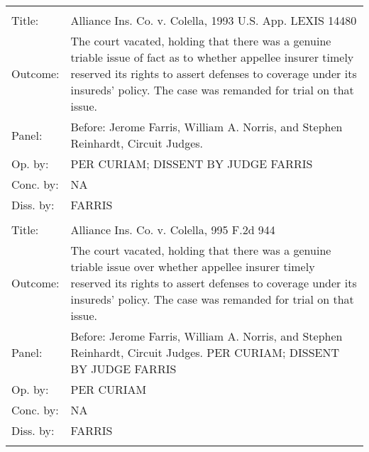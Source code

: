 \documentclass[10pt, letterpaper]{article}
\begin{document}
\begin{spacing}{1.0}
\begin{footnotesize}
\begin{longtable}[H]{lp{6in}}
        \arrayrulecolor{black}\hline\\[-4pt]
        Title: & Alliance Ins. Co. v. Colella, 1993 U.S. App. LEXIS 14480\\[2pt]
        Outcome: & The court vacated, holding that there was a genuine triable issue of fact as to whether appellee insurer timely reserved its rights to assert defenses to coverage under its insureds' policy. The case was remanded for trial on that issue.\\[2pt]
        Panel: & Before: Jerome Farris, William A. Norris, and Stephen Reinhardt, Circuit Judges.  \\[2pt]
        Op. by: & PER CURIAM; DISSENT BY JUDGE FARRIS \\[2pt]
        Conc. by: & NA\\[2pt]
        Diss. by: &  FARRIS \\[2pt]
        \arrayrulecolor{gray}\hline\\[-4pt]
        Title: & Alliance Ins. Co. v. Colella, 995 F.2d 944\\[2pt]
        Outcome: & The court vacated, holding that there was a genuine triable issue over whether appellee insurer timely reserved its rights to assert defenses to coverage under its insureds' policy. The case was remanded for trial on that issue.\\[2pt]
        Panel: & Before: Jerome Farris, William A. Norris, and Stephen Reinhardt, Circuit Judges. PER CURIAM; DISSENT BY JUDGE FARRIS \\[2pt]
        Op. by: & PER CURIAM \\[2pt]
        Conc. by: & NA\\[2pt]
        Diss. by: & FARRIS \\[2pt]
        
        \arrayrulecolor{black}\hline\\[-4pt]


\end{longtable}
\end{footnotesize}
\end{spacing}
\end{document}
